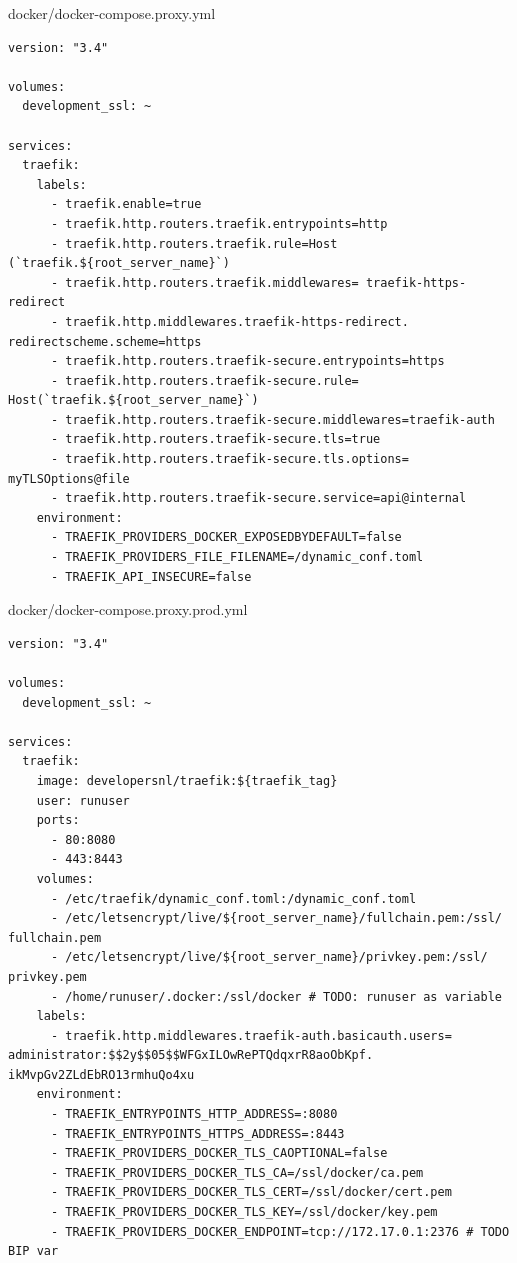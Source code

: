 docker/docker-compose.proxy.yml
\begin{verbatim}
version: "3.4"

volumes:
  development_ssl: ~

services:
  traefik:
    labels:
      - traefik.enable=true
      - traefik.http.routers.traefik.entrypoints=http
      - traefik.http.routers.traefik.rule=Host (`traefik.${root_server_name}`)
      - traefik.http.routers.traefik.middlewares= traefik-https-redirect
      - traefik.http.middlewares.traefik-https-redirect. redirectscheme.scheme=https
      - traefik.http.routers.traefik-secure.entrypoints=https
      - traefik.http.routers.traefik-secure.rule= Host(`traefik.${root_server_name}`)
      - traefik.http.routers.traefik-secure.middlewares=traefik-auth
      - traefik.http.routers.traefik-secure.tls=true
      - traefik.http.routers.traefik-secure.tls.options= myTLSOptions@file
      - traefik.http.routers.traefik-secure.service=api@internal
    environment:
      - TRAEFIK_PROVIDERS_DOCKER_EXPOSEDBYDEFAULT=false
      - TRAEFIK_PROVIDERS_FILE_FILENAME=/dynamic_conf.toml
      - TRAEFIK_API_INSECURE=false
\end{verbatim}

docker/docker-compose.proxy.prod.yml
\begin{verbatim}
version: "3.4"

volumes:
  development_ssl: ~

services:
  traefik:
    image: developersnl/traefik:${traefik_tag}
    user: runuser
    ports:
      - 80:8080
      - 443:8443
    volumes:
      - /etc/traefik/dynamic_conf.toml:/dynamic_conf.toml
      - /etc/letsencrypt/live/${root_server_name}/fullchain.pem:/ssl/ fullchain.pem
      - /etc/letsencrypt/live/${root_server_name}/privkey.pem:/ssl/ privkey.pem
      - /home/runuser/.docker:/ssl/docker # TODO: runuser as variable
    labels:
      - traefik.http.middlewares.traefik-auth.basicauth.users= administrator:$$2y$$05$$WFGxILOwRePTQdqxrR8aoObKpf. ikMvpGv2ZLdEbRO13rmhuQo4xu
    environment:
      - TRAEFIK_ENTRYPOINTS_HTTP_ADDRESS=:8080
      - TRAEFIK_ENTRYPOINTS_HTTPS_ADDRESS=:8443
      - TRAEFIK_PROVIDERS_DOCKER_TLS_CAOPTIONAL=false
      - TRAEFIK_PROVIDERS_DOCKER_TLS_CA=/ssl/docker/ca.pem
      - TRAEFIK_PROVIDERS_DOCKER_TLS_CERT=/ssl/docker/cert.pem
      - TRAEFIK_PROVIDERS_DOCKER_TLS_KEY=/ssl/docker/key.pem
      - TRAEFIK_PROVIDERS_DOCKER_ENDPOINT=tcp://172.17.0.1:2376 # TODO BIP var
\end{verbatim}

